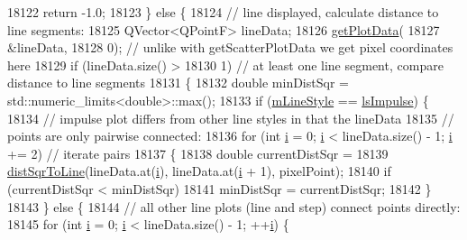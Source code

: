\begin{DoxyCode}
18122       \textcolor{keywordflow}{return} -1.0;
18123   \} \textcolor{keywordflow}{else} \{
18124     \textcolor{comment}{// line displayed, calculate distance to line segments:}
18125     QVector<QPointF> lineData;
18126     \hyperlink{class_q_c_p_graph_a466c661e015188971c862031af946693}{getPlotData}(
18127         &lineData,
18128         0); \textcolor{comment}{// unlike with getScatterPlotData we get pixel coordinates here}
18129     \textcolor{keywordflow}{if} (lineData.size() >
18130         1) \textcolor{comment}{// at least one line segment, compare distance to line segments}
18131     \{
18132       \textcolor{keywordtype}{double} minDistSqr = std::numeric\_limits<double>::max();
18133       \textcolor{keywordflow}{if} (\hyperlink{class_q_c_p_graph_a8604fd98402035a63375849f7341ee25}{mLineStyle} == \hyperlink{class_q_c_p_graph_ad60175cd9b5cac937c5ee685c32c0859aa3b358b4ae7cca94aceeb8e529c12ebb}{lsImpulse}) \{
18134         \textcolor{comment}{// impulse plot differs from other line styles in that the lineData}
18135         \textcolor{comment}{// points are only pairwise connected:}
18136         \textcolor{keywordflow}{for} (\textcolor{keywordtype}{int} \hyperlink{_comparision_pictures_2_createtest_image_8m_a6f6ccfcf58b31cb6412107d9d5281426}{i} = 0; \hyperlink{_comparision_pictures_2_createtest_image_8m_a6f6ccfcf58b31cb6412107d9d5281426}{i} < lineData.size() - 1; \hyperlink{_comparision_pictures_2_createtest_image_8m_a6f6ccfcf58b31cb6412107d9d5281426}{i} += 2) \textcolor{comment}{// iterate pairs}
18137         \{
18138           \textcolor{keywordtype}{double} currentDistSqr =
18139               \hyperlink{class_q_c_p_abstract_plottable_a5ea1cab44ca912dcdc96ed81ec5bed5d}{distSqrToLine}(lineData.at(\hyperlink{_comparision_pictures_2_createtest_image_8m_a6f6ccfcf58b31cb6412107d9d5281426}{i}), lineData.at(\hyperlink{_comparision_pictures_2_createtest_image_8m_a6f6ccfcf58b31cb6412107d9d5281426}{i} + 1), pixelPoint);
18140           \textcolor{keywordflow}{if} (currentDistSqr < minDistSqr)
18141             minDistSqr = currentDistSqr;
18142         \}
18143       \} \textcolor{keywordflow}{else} \{
18144         \textcolor{comment}{// all other line plots (line and step) connect points directly:}
18145         \textcolor{keywordflow}{for} (\textcolor{keywordtype}{int} \hyperlink{_comparision_pictures_2_createtest_image_8m_a6f6ccfcf58b31cb6412107d9d5281426}{i} = 0; \hyperlink{_comparision_pictures_2_createtest_image_8m_a6f6ccfcf58b31cb6412107d9d5281426}{i} < lineData.size() - 1; ++\hyperlink{_comparision_pictures_2_createtest_image_8m_a6f6ccfcf58b31cb6412107d9d5281426}{i}) \{

\end{DoxyCode}
